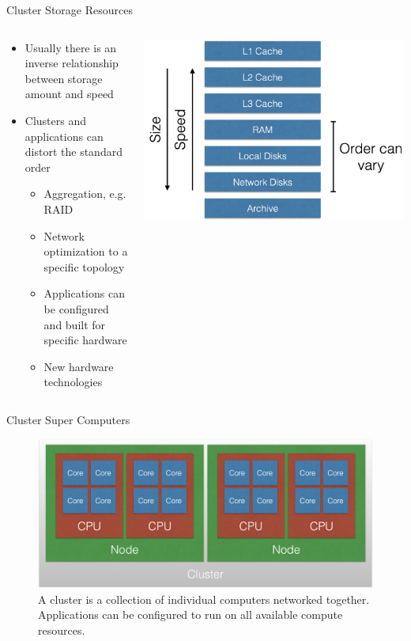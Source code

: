 \begin{frame}{Cluster Storage Resources}
\begin{columns}
\begin{column}{0.5\textwidth}
\begin{itemize}
\item Usually there is an inverse relationship between storage amount and speed
\item Clusters and applications can distort the standard order
\begin{itemize}
\item Aggregation, e.g. RAID
\item Network optimization to a specific topology
\item Applications can be configured and built for specific hardware
\item New hardware technologies
\end{itemize}
\end{itemize}
\end{column}
\begin{column}{0.5\textwidth}
\begin{center}
\includegraphics[width=\textwidth]{figures/storage_hierarchy.jpg}
\end{center}
\end{column}
\end{columns}
\end{frame}

\begin{frame}{Cluster Super Computers}
\begin{figure}
  \centering
  \includegraphics[width=0.75\linewidth]{figures/cluster.png}
  \caption{A cluster is a collection of individual computers networked together. Applications can be configured to run on all available compute resources.}
\end{figure}
\end{frame}

